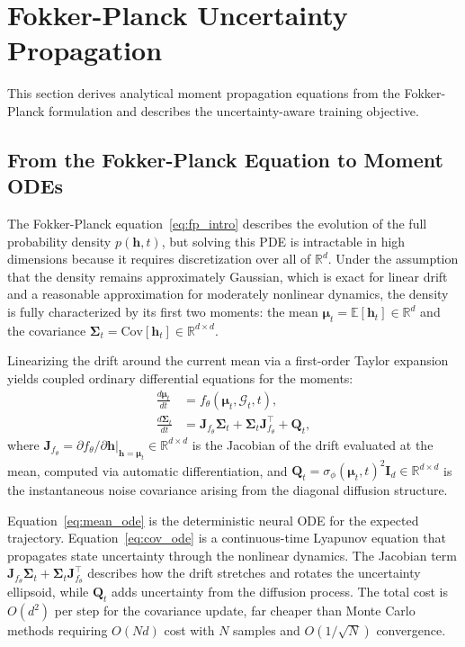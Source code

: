\documentclass[journal]{IEEEtran}
\newcommand{\R}{\mathbb{R}}
\newcommand{\E}{\mathbb{E}}
\newcommand{\G}{\mathcal{G}}
\begin{document}
\section{Fokker-Planck Uncertainty Propagation}
\label{sec:fokker_planck}

This section derives analytical moment propagation equations from the Fokker-Planck formulation and describes the uncertainty-aware training objective.

\subsection{From the Fokker-Planck Equation to Moment ODEs}

The Fokker-Planck equation~\eqref{eq:fp_intro} describes the evolution of the full probability density $p(\mathbf{h}, t)$, but solving this PDE is intractable in high dimensions because it requires discretization over all of $\R^d$. Under the assumption that the density remains approximately Gaussian, which is exact for linear drift and a reasonable approximation for moderately nonlinear dynamics, the density is fully characterized by its first two moments: the mean $\boldsymbol{\mu}_t = \E[\mathbf{h}_t] \in \R^d$ and the covariance $\boldsymbol{\Sigma}_t = \mathrm{Cov}[\mathbf{h}_t] \in \R^{d \times d}$.

Linearizing the drift around the current mean via a first-order Taylor expansion yields coupled ordinary differential equations for the moments:
\begin{align}
\frac{d\boldsymbol{\mu}_t}{dt} &= f_\theta(\boldsymbol{\mu}_t, \G_t, t), \label{eq:mean_ode} \\
\frac{d\boldsymbol{\Sigma}_t}{dt} &= \mathbf{J}_{f_\theta}\! \boldsymbol{\Sigma}_t + \boldsymbol{\Sigma}_t \mathbf{J}_{f_\theta}^\top + \mathbf{Q}_t, \label{eq:cov_ode}
\end{align}
where $\mathbf{J}_{f_\theta} = \partial f_\theta / \partial \mathbf{h}\big|_{\mathbf{h}=\boldsymbol{\mu}_t} \in \R^{d \times d}$ is the Jacobian of the drift evaluated at the mean, computed via automatic differentiation, and $\mathbf{Q}_t = \sigma_\phi(\boldsymbol{\mu}_t, t)^2 \mathbf{I}_d \in \R^{d \times d}$ is the instantaneous noise covariance arising from the diagonal diffusion structure.

Equation~\eqref{eq:mean_ode} is the deterministic neural ODE for the expected trajectory. Equation~\eqref{eq:cov_ode} is a continuous-time Lyapunov equation that propagates state uncertainty through the nonlinear dynamics. The Jacobian term $\mathbf{J}_{f_\theta} \boldsymbol{\Sigma}_t + \boldsymbol{\Sigma}_t \mathbf{J}_{f_\theta}^\top$ describes how the drift stretches and rotates the uncertainty ellipsoid, while $\mathbf{Q}_t$ adds uncertainty from the diffusion process. The total cost is $O(d^2)$ per step for the covariance update, far cheaper than Monte Carlo methods requiring $O(Nd)$ cost with $N$ samples and $O(1/\sqrt{N})$ convergence.
\end{document}
